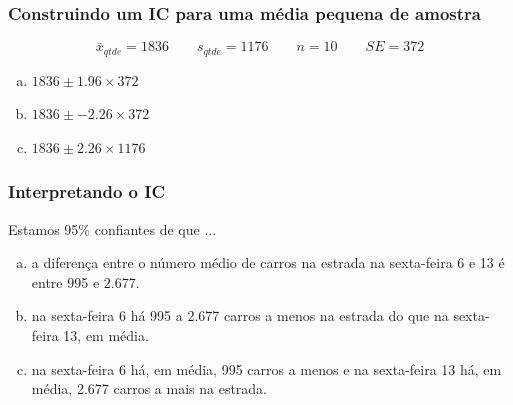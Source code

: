 
\begin{frame}
\frametitle{Construindo um IC para uma média pequena de amostra}
\justifying
{}
\[ \bar{x}_{qtde} = 1836 \qquad s_{qtde} = 1176 \qquad n = 10 \qquad SE = 372 \]

{
\begin{enumerate}[(a)]

\item $1836 \pm 1.96 \times 372$


\item $1836 \pm -2.26 \times 372$

\item $1836 \pm 2.26 \times 1176$

\end{enumerate}
}
{
\vspace{0.25cm}
}

\end{frame}


\begin{frame}
\frametitle{Interpretando o IC}
\justifying
{}
\justifying
Estamos 95\% confiantes de que ...

\begin{enumerate}[(a)]
\justifying
\item a diferença entre o número médio de carros na estrada na sexta-feira 6 e 13 é entre 995 e 2.677.
\justifying
\item na sexta-feira 6 há 995 a 2.677 carros a menos na estrada do que na sexta-feira 13, em média.
\justifying
\item na sexta-feira 6 há, em média, 995 carros a menos e na sexta-feira 13 há, em média, 2.677 carros a mais na estrada.
\justifying
{}

\end{enumerate}

\end{frame}

